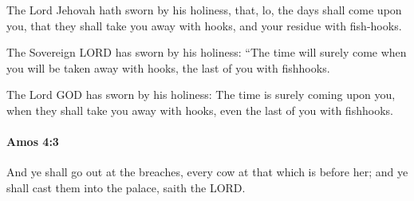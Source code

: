 			\begin{versebox}
					\item[BHS] 
					\item[LXX] 
					\item[ASV] The Lord Jehovah hath sworn by his holiness, that, lo, the days shall come upon you, that they shall take you away with hooks, and your residue with fish-hooks.
					\item[NIV] The Sovereign LORD has sworn by his holiness: “The time will surely come when you will be taken away with hooks, the last of you with fishhooks.
					\item[NRSV] The Lord GOD has sworn by his holiness: The time is surely coming upon you, when they shall take you away with hooks, even the last of you with fishhooks.
			\end{versebox}

		\paragraph{Amos 4:3} %
			\label{AMOS-4-3}

			And ye shall go out at the breaches, every cow at that which is before her; and ye shall cast them into the palace, saith the LORD.

